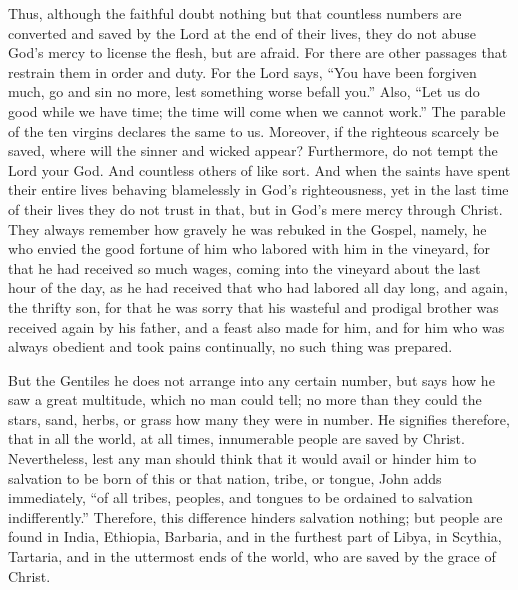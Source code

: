 Thus, although the faithful doubt nothing but that countless numbers are converted and saved by the Lord at the end of their lives, they do not abuse God’s mercy to license the flesh, but are afraid. For there are other passages that restrain them in order and duty. For the Lord says, “You have been forgiven much, go and sin no more, lest something worse befall you.” Also, “Let us do good while we have time; the time will come when we cannot work.” The parable of the ten virgins declares the same to us. Moreover, if the righteous scarcely be saved, where will the sinner and wicked appear? Furthermore, do not tempt the Lord your God. And countless others of like sort. And when the saints have spent their entire lives behaving blamelessly in God’s righteousness, yet in the last time of their lives they do not trust in that, but in God’s mere mercy through Christ. They always remember how gravely he was rebuked in the Gospel, namely, he who envied the good fortune of him who labored with him in the vineyard, for that he had received so much wages, coming into the vineyard about the last hour of the day, as he had received that who had labored all day long, and again, the thrifty son, for that he was sorry that his wasteful and prodigal brother was received again by his father, and a feast also made for him, and for him who was always obedient and took pains continually, no such thing was prepared.

But the Gentiles he does not arrange into any certain number, but says how he saw a great multitude, which no man could tell; no more than they could the stars, sand, herbs, or grass how many they were in number. He signifies therefore, that in all the world, at all times, innumerable people are saved by Christ. Nevertheless, lest any man should think that it would avail or hinder him to salvation to be born of this or that nation, tribe, or tongue, John adds immediately, “of all tribes, peoples, and tongues to be ordained to salvation indifferently.” Therefore, this difference hinders salvation nothing; but people are found in India, Ethiopia, Barbaria, and in the furthest part of Libya, in Scythia, Tartaria, and in the uttermost ends of the world, who are saved by the grace of Christ.

